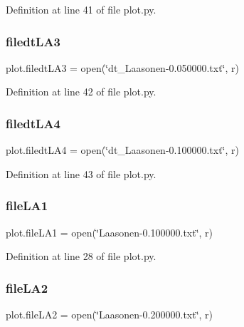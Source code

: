 Definition at line 41 of file plot.\+py.

\mbox{\label{namespaceplot_a3786aea5eaaf9d2f26ba20279285508f}} 
\subsubsection{filedt\+L\+A3}
{\footnotesize\ttfamily plot.\+filedt\+L\+A3 = open(\char`\"{}dt\+\_\+\+Laasonen-\/0.\+050000.txt\char`\"{}, \textquotesingle{}r\textquotesingle{})}



Definition at line 42 of file plot.\+py.

\mbox{\label{namespaceplot_ac6c1e210cec249089265df406a368618}} 
\subsubsection{filedt\+L\+A4}
{\footnotesize\ttfamily plot.\+filedt\+L\+A4 = open(\char`\"{}dt\+\_\+\+Laasonen-\/0.\+100000.txt\char`\"{}, \textquotesingle{}r\textquotesingle{})}



Definition at line 43 of file plot.\+py.

\mbox{\label{namespaceplot_a922aa2451d946de243e4a0e9630192a6}} 
\subsubsection{file\+L\+A1}
{\footnotesize\ttfamily plot.\+file\+L\+A1 = open(\char`\"{}Laasonen-\/0.\+100000.txt\char`\"{}, \textquotesingle{}r\textquotesingle{})}



Definition at line 28 of file plot.\+py.

\mbox{\label{namespaceplot_ac0949bee66c1c043cee6659cc4021b23}} 
\subsubsection{file\+L\+A2}
{\footnotesize\ttfamily plot.\+file\+L\+A2 = open(\char`\"{}Laasonen-\/0.\+200000.txt\char`\"{}, \textquotesingle{}r\textquotesingle{})}




